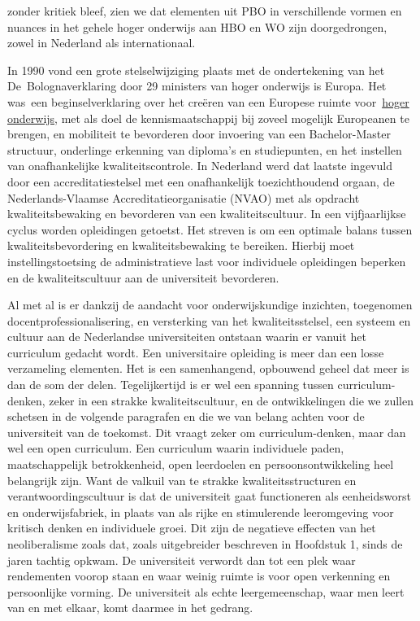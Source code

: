 \documentclass{jote-book}
\begin{document}
zonder kritiek bleef, zien we dat elementen uit PBO in verschillende vormen en nuances in het gehele hoger onderwijs aan HBO en WO zijn doorgedrongen, zowel in Nederland als internationaal.



	In 1990 vond een grote stelselwijziging plaats met de ondertekening van het De Bolognaverklaring door 29 ministers van hoger onderwijs is Europa. Het was een beginselverklaring over het creëren van een Europese ruimte voor \href{https://nl.wikipedia.org/wiki/Hoger_onderwijs}{hoger onderwijs}, met als doel de kennismaatschappij bij zoveel mogelijk Europeanen te brengen, en mobiliteit te bevorderen door invoering van een Bachelor-Master structuur, onderlinge erkenning van diploma's en studiepunten, en het instellen van onafhankelijke kwaliteitscontrole. In Nederland werd dat laatste ingevuld door een accreditatiestelsel met een onafhankelijk toezichthoudend orgaan, de Nederlands-Vlaamse Accreditatieorganisatie (NVAO) met als opdracht kwaliteitsbewaking en bevorderen van een kwaliteitscultuur. In een vijfjaarlijkse cyclus worden opleidingen getoetst. Het streven is om een optimale balans tussen kwaliteitsbevordering en kwaliteitsbewaking te bereiken. Hierbij moet instellingstoetsing de administratieve last voor individuele opleidingen beperken en de kwaliteitscultuur aan de universiteit bevorderen.



	Al met al is er dankzij de aandacht voor onderwijskundige inzichten, toegenomen docentprofessionalisering, en versterking van het kwaliteitsstelsel, een systeem en cultuur aan de Nederlandse universiteiten ontstaan waarin er vanuit het curriculum gedacht wordt. Een universitaire opleiding is meer dan een losse verzameling elementen. Het is een samenhangend, opbouwend geheel dat meer is dan de som der delen. Tegelijkertijd is er wel een spanning tussen curriculum-denken, zeker in een strakke kwaliteitscultuur, en de ontwikkelingen die we zullen schetsen in de volgende paragrafen en die we van belang achten voor de universiteit van de toekomst. Dit vraagt zeker om curriculum-denken, maar dan wel een open curriculum. Een curriculum waarin individuele paden, maatschappelijk betrokkenheid, open leerdoelen en persoonsontwikkeling heel belangrijk zijn. Want de valkuil van te strakke kwaliteitsstructuren en verantwoordingscultuur is dat de universiteit gaat functioneren als eenheidsworst en onderwijsfabriek, in plaats van als rijke en stimulerende leeromgeving voor kritisch denken en individuele groei. Dit zijn de negatieve effecten van het neoliberalisme zoals dat, zoals uitgebreider beschreven in Hoofdstuk 1, sinds de jaren tachtig opkwam. De universiteit verwordt dan tot een plek waar rendementen voorop staan en waar weinig ruimte is voor open verkenning en persoonlijke vorming. De universiteit als echte leergemeenschap, waar men leert van en met elkaar, komt daarmee in het gedrang.
\end{document}
